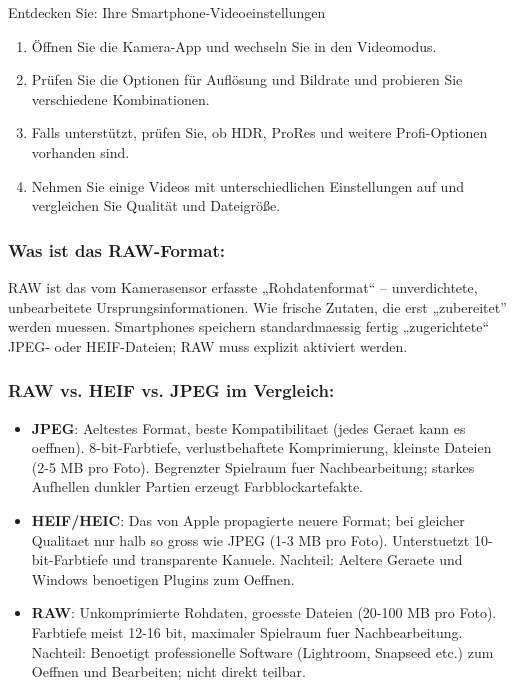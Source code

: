 \begin{tcbpractice}{Entdecken Sie: Ihre Smartphone-Videoeinstellungen}
\begin{enumerate}
  \item Öffnen Sie die Kamera-App und wechseln Sie in den Videomodus.
  \item Prüfen Sie die Optionen für Auflösung und Bildrate und probieren Sie verschiedene Kombinationen.
  \item Falls unterstützt, prüfen Sie, ob HDR, ProRes und weitere Profi-Optionen vorhanden sind.
  \item Nehmen Sie einige Videos mit unterschiedlichen Einstellungen auf und vergleichen Sie Qualität und Dateigröße.
\end{enumerate}

\end{tcbpractice}


\subsubsection*{Was ist das RAW-Format:}

RAW ist das vom Kamerasensor erfasste „Rohdatenformat“ – unverdichtete, unbearbeitete Ursprungsinformationen. Wie frische Zutaten, die erst „zubereitet” werden muessen. Smartphones speichern standardmaessig fertig „zugerichtete“ JPEG- oder HEIF-Dateien; RAW muss explizit aktiviert werden.

\subsubsection*{RAW vs. HEIF vs. JPEG im Vergleich:}

\begin{itemize}
  \item \textbf{JPEG}: Aeltestes Format, beste Kompatibilitaet (jedes Geraet kann es oeffnen). 8-bit-Farbtiefe, verlustbehaftete Komprimierung, kleinste Dateien (2-5 MB pro Foto). Begrenzter Spielraum fuer Nachbearbeitung; starkes Aufhellen dunkler Partien erzeugt Farbblockartefakte.
  \item \textbf{HEIF/HEIC}: Das von Apple propagierte neuere Format; bei gleicher Qualitaet nur halb so gross wie JPEG (1-3 MB pro Foto). Unterstuetzt 10-bit-Farbtiefe und transparente Kanuele. Nachteil: Aeltere Geraete und Windows benoetigen Plugins zum Oeffnen.
  \item \textbf{RAW}: Unkomprimierte Rohdaten, groesste Dateien (20-100 MB pro Foto). Farbtiefe meist 12-16 bit, maximaler Spielraum fuer Nachbearbeitung. Nachteil: Benoetigt professionelle Software (Lightroom, Snapseed etc.) zum Oeffnen und Bearbeiten; nicht direkt teilbar.
\end{itemize}

